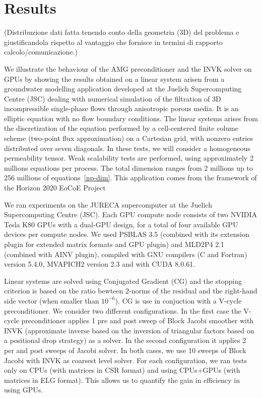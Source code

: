 \section{Results}
(Distribuzione dati fatta tenendo conto della geometria (3D) del
problema e giustificandola rispetto al vantaggio che fornisce in
termini di rapporto calcolo/comunicazione.) 

We illustrate the behaviour of the AMG preconditioner and the INVK
solver on GPUs  by showing the results obtained on a linear system
arisen from a groundwater modelling application developed at the
Juelich Supercomputing Centre (JSC)  dealing with numerical simulation
of the filtration of 3D incompressible single-phase flows through
anisotropic porous media. It is an elliptic equation with no flow
boundary conditions. The linear systems arises from the discretization
of the equation performed by a cell-centered finite colume scheme
(two-point flux approximation) on a Cartesian grid, with nonzero
entries distributed over seven diagonals. In these tests, we will
consider a homogeneous permeability tensor.  
Weak scalability tests are performed, using approximately 2 millions
equations per process. The total dimension ranges from 2 millions up
to 256 millions of equations~\ref{np-dim}. 
This application comes from the framework of the Horizon 2020 EoCoE
Project 

We ran experiments on the JURECA supercomputer at the Juelich
Supercomputing Centre (JSC).  Each GPU compute node consists of two
NVIDIA Tesla K80 GPUs with a dual-GPU design, for a total of four
available GPU devices per compute nodes.  
We used PSBLAS 3.5 (combined with its extension plugin for extended
matrix formats and GPU plugin) and MLD2P4 2.1 (combined with AINV
plugin),  compiled with  GNU compilers (C and Fortran) version 5.4.0,
MVAPICH2 version 2.3 and with CUDA 8.0.61. 

Linear systems are solved using Conjugated Gradient (CG) and the
stopping criterion is based on the ratio bewteen 2-norms of the
residual and the right-hand side vector (when smaller than
$10^{-6}$). CG is use in conjuction with a V-cycle preconditioner. We
consider two different configurations. In the first case the V-cycle
preconditioner applies 1 pre and post sweep of Block Jacobi smoother
with INVK (approximate inverse based on the inversion of triangular
factors based on a positional drop strategy) as a solver. In the
second configuration it applies 2 per and post sweeps of Jacobi
solver. In both cases, we use 10 sweeps of Block Jacobi with INVK  as
coarsest level solver.   
For each configuration, we ran tests only on CPUs (with matrices in
CSR format) and using CPUs+GPUs (with matrices in ELG format). This
allows us to quantify the gain in efficiency in using GPUs.   

